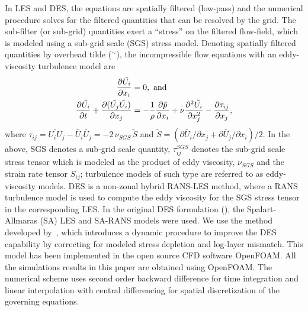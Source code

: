 In LES and DES, the equations are spatially filtered (low-pass) and the
numerical procedure solves for the filtered quantities that can be resolved by
the grid. The sub-filter (or sub-grid) quantities exert a ``stress'' on the
filtered flow-field, which is modeled using a sub-grid scale (SGS) stress
model. Denoting spatially filtered quantities by overhead tilde ($^\sim$), the
incompressible flow equations with an eddy-viscosity turbulence model are
%
\begin{align}
  \frac{\partial{\tilde{U_i}}}{\partial{x_i}}&=0,~{\rm and} \nonumber \\
   \frac{\partial{\tilde{U_i}}}{\partial{t}}+
   \frac{\partial{(\tilde{U_j}\tilde{U_i})}}{\partial{x_j}}
   &=-\frac{1}{\rho}\frac{\partial{\tilde{p}}}{\partial{x_i}}+\nu\frac{\partial{^2\tilde{U_i}}}{\partial{x_j^2}}-\frac{\partial{\tau_{ij}}}{\partial{x_j}},
 \label{eq:geqs}
\end{align}
%
where $\tau_{ij} = \widetilde{U_i U_j}-\tilde{U_i}\tilde{U_j} = -2 \, \nu_{SGS}
\, \tilde{S}$ and $\tilde{S} = (\partial{\tilde{U_i}}/\partial{x_j} +
\partial{\tilde{U_j}}/\partial{x_i})/2$. In the above, SGS denotes a sub-grid
scale quantity, $\tau_{ij}^{SGS}$ denotes the sub-grid scale stress tensor
which is modeled as the product of eddy viscosity, $\nu_{SGS}$ and the strain
rate tensor $S_{ij}$; turbulence models of such type are referred to as
eddy-viscosity models. DES is a non-zonal hybrid RANS-LES method, where a RANS
turbulence model is used to compute the eddy viscosity for the SGS stress
tensor in the corresponding LES. In the original DES formulation
(\cite{spalart1997comments}), the Spalart-Allmaras (SA) LES and SA-RANS models
were used. We use the method developed by~\cite{yin2015dynamic}, which
introduces a dynamic procedure to improve the DES capability by correcting for
modeled stress depletion and log-layer mismatch. This model has been
implemented in the open source CFD software OpenFOAM. All the simulations
results in this paper are obtained using OpenFOAM. The numerical scheme uses
second order backward difference for time integration and linear interpolation
with central differencing for spatial discretization of the governing
equations.

